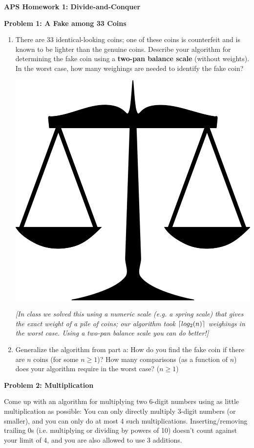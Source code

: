 \documentclass[]{article}
\DeclarePairedDelimiter{\ceil}{\lceil}{\rceil}
\begin{document}
\textbf{APS Homework 1: Divide-and-Conquer}

\medskip
\textbf{Problem 1: A Fake among 33 Coins}
\begin{enumerate}[label=\alph*]
  \item There are $33$ identical-looking coins; one of these coins is counterfeit and is known to be lighter
  than the genuine coins. Describe your algorithm for determining the fake coin using a \textbf{two-pan balance scale}
  (without weights). In the worst case, how many weighings are needed to identify the fake coin?

  \includegraphics[scale=.2]{twoPanBalance}

  \textit{[In class we solved this using a numeric scale (e.g. a spring scale) that gives the exact weight
  of a pile of coins; our algorithm took $\ceil{log_2(n)}$ weighings in the worst case. Using a two-pan balance
  scale you can do better!]}

  \item Generalize the algorithm from part a: How do you find the fake coin if there are $n$ coins
  (for some $n \geq 1$)? How many comparisons (as a function of $n$) does
  your algorithm require in the worst case? ($n \geq 1$)
\end{enumerate}

\medskip
\textbf{Problem 2: Multiplication}

Come up with an algorithm for multiplying two 6-digit numbers using as little multiplication as possible:
You can only directly multiply 3-digit numbers (or smaller), and you can only do at most 4 such multiplications.
Inserting/removing trailing 0s (i.e. multiplying or dividing by powers of 10) doesn't count against your limit of 4,
and you are also allowed to use 3 additions.
\end{document}
